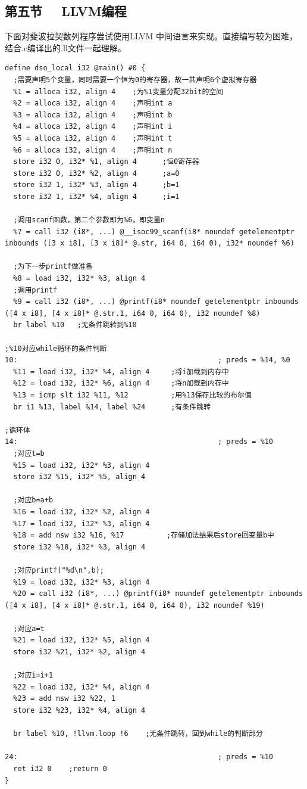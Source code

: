 \documentclass[UTF8,a4paper,10pt]{ctexart}
\begin{document}
\subsection{第五节 \ \ LLVM编程}
下面对斐波拉契数列程序尝试使用LLVM 中间语言来实现。直接编写较为困难，结合.c编译出的.ll文件一起理解。
\begin{lstlisting}[frame=trbl]
define dso_local i32 @main() #0 {
  ;需要声明5个变量，同时需要一个恒为0的寄存器，故一共声明6个虚拟寄存器
  %1 = alloca i32, align 4    ;为%1变量分配32bit的空间
  %2 = alloca i32, align 4    ;声明int a
  %3 = alloca i32, align 4    ;声明int b
  %4 = alloca i32, align 4    ;声明int i
  %5 = alloca i32, align 4    ;声明int t
  %6 = alloca i32, align 4    ;声明int n
  store i32 0, i32* %1, align 4      ;恒0寄存器
  store i32 0, i32* %2, align 4      ;a=0
  store i32 1, i32* %3, align 4      ;b=1
  store i32 1, i32* %4, align 4      ;i=1
  
  ;调用scanf函数，第二个参数即为%6，即变量n
  %7 = call i32 (i8*, ...) @__isoc99_scanf(i8* noundef getelementptr inbounds ([3 x i8], [3 x i8]* @.str, i64 0, i64 0), i32* noundef %6)
  
  ;为下一步printf做准备
  %8 = load i32, i32* %3, align 4
  ;调用printf
  %9 = call i32 (i8*, ...) @printf(i8* noundef getelementptr inbounds ([4 x i8], [4 x i8]* @.str.1, i64 0, i64 0), i32 noundef %8)
  br label %10   ;无条件跳转到%10

;%10对应while循环的条件判断
10:                                               ; preds = %14, %0
  %11 = load i32, i32* %4, align 4     ;将i加载到内存中
  %12 = load i32, i32* %6, align 4     ;将n加载到内存中
  %13 = icmp slt i32 %11, %12          ;用%13保存比较的布尔值
  br i1 %13, label %14, label %24      ;有条件跳转

;循环体
14:                                               ; preds = %10
  ;对应t=b
  %15 = load i32, i32* %3, align 4    
  store i32 %15, i32* %5, align 4
  
  ;对应b=a+b
  %16 = load i32, i32* %2, align 4
  %17 = load i32, i32* %3, align 4
  %18 = add nsw i32 %16, %17          ;存储加法结果后store回变量b中
  store i32 %18, i32* %3, align 4

  ;对应printf("%d\n",b);
  %19 = load i32, i32* %3, align 4
  %20 = call i32 (i8*, ...) @printf(i8* noundef getelementptr inbounds ([4 x i8], [4 x i8]* @.str.1, i64 0, i64 0), i32 noundef %19)

  ;对应a=t
  %21 = load i32, i32* %5, align 4
  store i32 %21, i32* %2, align 4

  ;对应i=i+1
  %22 = load i32, i32* %4, align 4
  %23 = add nsw i32 %22, 1
  store i32 %23, i32* %4, align 4
  
  br label %10, !llvm.loop !6    ;无条件跳转，回到while的判断部分

24:                                               ; preds = %10
  ret i32 0    ;return 0
}
\end{lstlisting}\par
\end{document}
